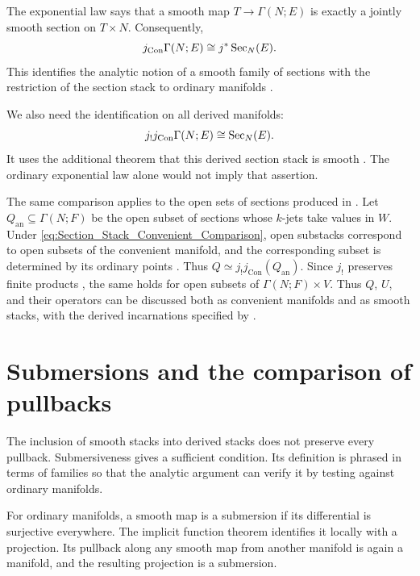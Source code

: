 The exponential law says that a smooth map
$T\to\Gamma(N;E)$ is exactly a jointly smooth section on $T\times N$.
Consequently,
\[
 j_{\mathrm{Con}}\Gamma(N;E)\cong j^*\operatorname{Sec}_N(E).
\]
This identifies the analytic notion of a smooth family of sections
with the restriction of the section stack to ordinary manifolds
\cite[Proposition~3.1.9]{Steffens_Representability_Elliptic_Moduli}.

We also need the identification on all derived manifolds:
\begin{equation}\label{eq:Section_Stack_Convenient_Comparison}
 j_!j_{\mathrm{Con}}\Gamma(N;E)\cong\operatorname{Sec}_N(E).
\end{equation}
It uses the additional theorem that this derived section stack is smooth
\cite[Lemma~3.2.11]{Steffens_Representability_Elliptic_Moduli}.
The ordinary exponential law alone would not imply that assertion.

The same comparison applies to the open sets of sections produced in
. Let
$Q_{\mathrm{an}}\subseteq\Gamma(N;F)$ be the open subset of sections
whose $k$-jets take values in $W$. Under \eqref{eq:Section_Stack_Convenient_Comparison},
open substacks correspond to open subsets of the convenient manifold,
and the corresponding subset is determined by its ordinary points
\cite[Propositions~3.1.11(1) and~3.1.12]{Steffens_Representability_Elliptic_Moduli}.
Thus $Q\simeq j_!j_{\mathrm{Con}}(Q_{\mathrm{an}})$.
Since $j_!$ preserves finite products
\cite[Lemma~2.2.14]{Steffens_Representability_Elliptic_Moduli}, the same
holds for open subsets of $\Gamma(N;F)\times V$. Thus $Q$, $U$, and their
operators can be discussed both as convenient manifolds and as smooth
stacks, with the derived incarnations specified by
.

\section{Submersions and the comparison of pullbacks}

The inclusion of smooth stacks into derived stacks does not preserve
every pullback. Submersiveness gives a sufficient condition. Its
definition is phrased in terms of families so that the analytic
argument can verify it by testing against ordinary manifolds.

For ordinary manifolds, a smooth map is a submersion if its differential
is surjective everywhere. The implicit function theorem identifies it
locally with a projection. Its pullback along any smooth map from
another manifold is again a manifold, and the resulting projection
is a submersion.

